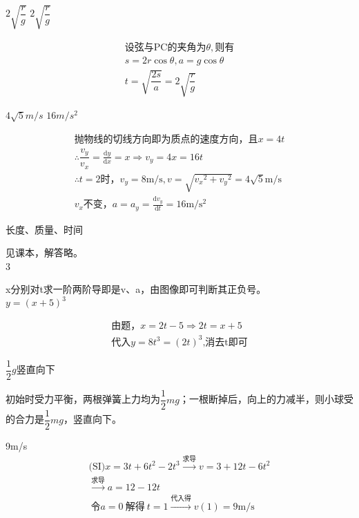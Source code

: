 \documentclass[b5paper,opensource]{./template/qyxf-book}
\newcommand{\di}[1]{\mathrm{d}#1}
\newcommand{\dy}[2]{\frac{\di{#1}}{\di{#2}}}
\begin{document}
 $2\sqrt{\dfrac{r}{g}}$ \qquad $2\sqrt{\dfrac{r}{g}}$

\solve
\begin{gather*}
\text{设弦与PC的夹角为}\theta,\text{则有}\\
s=2r\cos\theta,a=g\cos\theta\\
t=\sqrt{\dfrac{2s}{a}}=2\sqrt{\dfrac{r}{g}}
\end{gather*}

 $4\sqrt{5}m/s$ \qquad $16m/s^2 $ 

\solve
\begin{gather*}	
\text{抛物线的切线方向即为质点的速度方向，且}x=4t\\
\therefore \dfrac{v_y}{v_x}=\dy{y}{x}=x\Rightarrow v_y=4x=16t\\
\therefore t=2\text{时，}v_y=8\mathrm{m/s},
v=\sqrt{{v_x}^2+{v_y}^2}=4\sqrt{5}\mathrm{m/s}\\
v_x\text{不变，}a=a_y=\dy{v_y}{t}=16\mathrm{m/s^2}
\end{gather*}

 长度、质量、时间\par

\solve 见课本，解答略。\\

 3

\solve x分别对t求一阶两阶导即是v、a，由图像即可判断其正负号。\\

 $y={(x+5)}^3$

\solve
\begin{gather*}\text{由题，}x=2t-5\Rightarrow 2t=x+5\\
\text{代入}y=8t^3={(2t)}^3\text{,消去t即可}
\end{gather*}	

 $\dfrac{1}{2}g$\qquad 竖直向下%

\solve  初始时受力平衡，两根弹簧上力均为$\dfrac{1}{2}mg$；一根断掉后，向上的力减半，则小球受的合力是$\dfrac{1}{2}mg$，竖直向下。

 9m/s 
\solve
\begin{gather*}\text{(SI)} x=3t+6t^2-2t^3\xrightarrow{\text{求导}}v=3+12t-6t^2\\
\xrightarrow{\text{求导}}a=12-12t\\\
令a=0\ \text{解得}\ t=1\xrightarrow{\text{代入得}} v(1)=9\mathrm{m/s}
\end{gather*}
\end{document}
